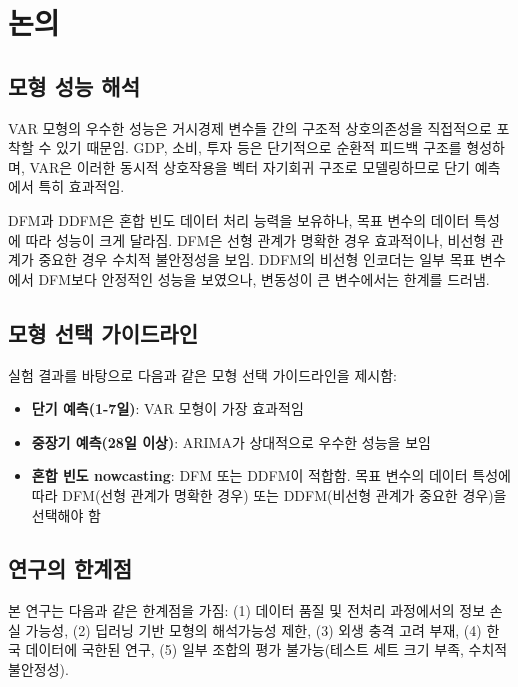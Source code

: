 \section{논의}
\label{sec:discussion}

\subsection{모형 성능 해석}

VAR 모형의 우수한 성능은 거시경제 변수들 간의 구조적 상호의존성을 직접적으로 포착할 수 있기 때문임. GDP, 소비, 투자 등은 단기적으로 순환적 피드백 구조를 형성하며, VAR은 이러한 동시적 상호작용을 벡터 자기회귀 구조로 모델링하므로 단기 예측에서 특히 효과적임.

DFM과 DDFM은 혼합 빈도 데이터 처리 능력을 보유하나, 목표 변수의 데이터 특성에 따라 성능이 크게 달라짐. DFM은 선형 관계가 명확한 경우 효과적이나, 비선형 관계가 중요한 경우 수치적 불안정성을 보임. DDFM의 비선형 인코더는 일부 목표 변수에서 DFM보다 안정적인 성능을 보였으나, 변동성이 큰 변수에서는 한계를 드러냄.

\subsection{모형 선택 가이드라인}

실험 결과를 바탕으로 다음과 같은 모형 선택 가이드라인을 제시함:
\begin{itemize}
    \item \textbf{단기 예측(1-7일)}: VAR 모형이 가장 효과적임
    \item \textbf{중장기 예측(28일 이상)}: ARIMA가 상대적으로 우수한 성능을 보임
    \item \textbf{혼합 빈도 nowcasting}: DFM 또는 DDFM이 적합함. 목표 변수의 데이터 특성에 따라 DFM(선형 관계가 명확한 경우) 또는 DDFM(비선형 관계가 중요한 경우)을 선택해야 함
\end{itemize}

\subsection{연구의 한계점}

본 연구는 다음과 같은 한계점을 가짐: (1) 데이터 품질 및 전처리 과정에서의 정보 손실 가능성, (2) 딥러닝 기반 모형의 해석가능성 제한, (3) 외생 충격 고려 부재, (4) 한국 데이터에 국한된 연구, (5) 일부 조합의 평가 불가능(테스트 세트 크기 부족, 수치적 불안정성).

